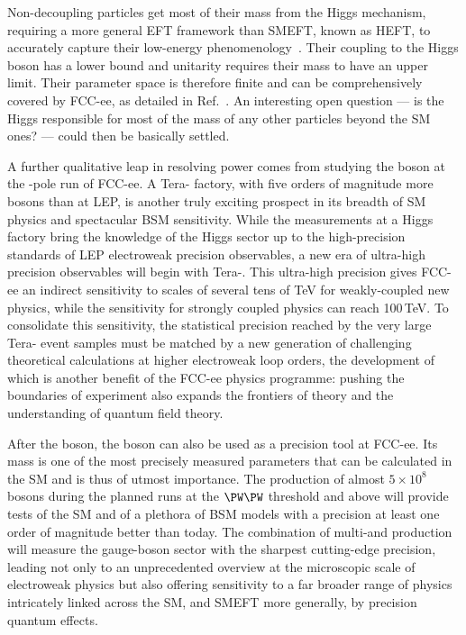 Non-decoupling particles  get most of their mass from the Higgs mechanism,  
requiring a more general EFT framework than SMEFT, known as HEFT, 
to accurately capture their low-energy phenomenology~\cite{Banta:2021dek}. 
Their coupling to the Higgs boson has a lower bound and unitarity requires their mass to have an upper limit. 
Their parameter space is therefore finite and can be comprehensively covered by FCC-ee, as detailed in Ref.~\cite{Crawford:2024nun}.
An interesting open question --- 
is the Higgs responsible for most of the mass of any other particles beyond the SM ones? ---
could then be basically settled. 

A further qualitative leap in resolving power comes from studying the \PZ boson at the \PZ-pole run of FCC-ee. 
A \mbox{Tera-\PZ} factory, with five orders of magnitude more \PZ bosons than at LEP, 
is another truly exciting prospect in its breadth of SM physics and spectacular BSM sensitivity. 
While the measurements at a Higgs factory bring the knowledge of the Higgs sector 
up to the high-precision standards of LEP electroweak precision observables, 
a new era of ultra-high precision observables will begin with \mbox{Tera-\PZ}. 
This ultra-high precision gives FCC-ee an indirect sensitivity to scales of several tens of TeV for weakly-coupled new physics, 
while the sensitivity for strongly coupled physics can reach 100\,TeV. 
To consolidate this sensitivity, the statistical precision reached by the very large \mbox{Tera-\PZ} event samples 
must be matched by a new generation of challenging theoretical calculations at higher electroweak loop orders, 
the development of which is another benefit of the FCC-ee physics programme: 
pushing the boundaries of experiment also expands the frontiers of theory and the understanding of quantum field theory.

After the \PZ boson, the \PW boson can also be used as a precision tool at FCC-ee. 
Its mass is one of the most precisely measured parameters that can be calculated in the SM and is thus of utmost importance. 
The production of almost $5 \times 10^8$ \PW bosons during the planned runs at the $\PW\PW$ threshold and above 
will provide tests of the SM and of a plethora of BSM models with a precision at least one order of magnitude better than today.
The combination of multi-\PZ and \PW production will measure the gauge-boson sector with the sharpest cutting-edge precision, 
leading not only to an unprecedented overview at the microscopic scale of electroweak physics 
but also offering sensitivity to a far broader range of physics intricately linked across the SM, 
and SMEFT more generally, by precision quantum effects.

